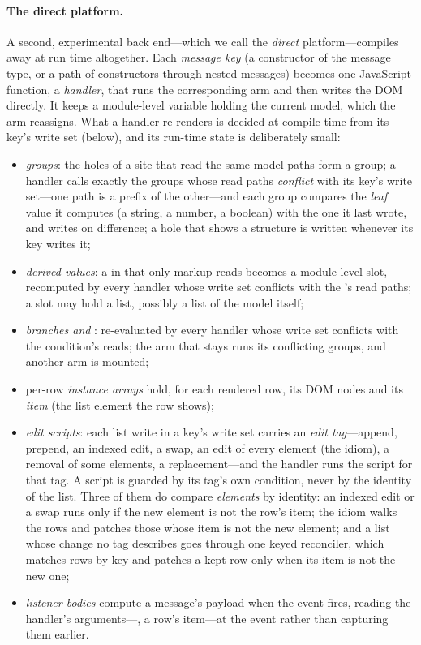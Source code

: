 \paragraph{The direct platform.} A second, experimental back end---which we call the \emph{direct}
platform---compiles away  at run time altogether. Each \emph{message key} (a constructor of
the message type, or a path of constructors through nested messages) becomes one JavaScript function, a
\emph{handler}, that runs the corresponding  arm and then writes the DOM directly. It keeps
a module-level variable holding the current model, which the arm reassigns. What a handler re-renders
is decided at compile time from its key's write set (below), and its run-time state is deliberately
small:
\begin{itemize}
\item \emph{groups}: the holes of a site that read the same model paths form a group; a handler calls
exactly the groups whose read paths \emph{conflict} with its key's write set---one path is a prefix of
the other---and each group compares the \emph{leaf} value it computes (a string, a number, a boolean)
with the one it last wrote, and writes on difference; a hole that shows a structure is written whenever
its key writes it;
\item \emph{derived values}: a  in  that only markup reads becomes a module-level
slot, recomputed by every handler whose write set conflicts with the 's read paths; a slot may
hold a list, possibly a list of the model itself;
\item \emph{branches and }: re-evaluated by every handler whose write set conflicts with the
condition's reads; the arm that stays runs its conflicting groups, and another arm is mounted;
\item per-row \emph{instance arrays} hold, for each rendered row, its DOM nodes and its \emph{item} (the
list element the row shows);
\item \emph{edit scripts}: each list write in a key's write set carries an \emph{edit tag}---append,
prepend, an indexed edit, a swap, an edit of every element (the  idiom), a removal of some
elements, a replacement---and the handler runs the script for that tag. A script is guarded by its
tag's own condition, never by the identity of the list. Three of them do compare \emph{elements} by
identity: an indexed edit or a swap runs only if the new element is not \code{===} the row's item; the
 idiom walks the rows and patches those whose item is not \code{===} the new element; and a
list whose change no tag describes goes through one keyed reconciler, which matches rows by key and
patches a kept row only when its item is not \code{===} the new one;
\item \emph{listener bodies} compute a message's payload when the event fires, reading the handler's
arguments---, a row's item---at the event rather than capturing them earlier.
\end{itemize}
